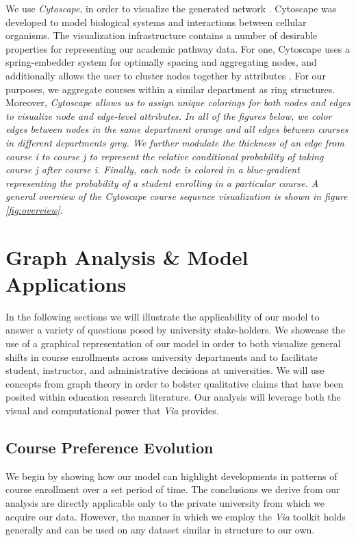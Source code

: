 \documentclass{sigchi}
\begin{document}
We use \textit{Cytoscape}, in order to visualize the  generated network \cite{shannon2003cytoscape}. Cytoscape was developed to model biological systems and interactions between cellular organisms. The visualization infrastructure contains a number of desirable properties for representing our academic pathway data. For one, Cytoscape uses a spring-embedder system for optimally spacing and aggregating nodes, and additionally allows the user to cluster nodes together by attributes \cite{Battista1994}. For our purposes, we aggregate courses within a similar department as ring structures. Moreover, \em{Cytoscape} allows us to assign unique colorings for both nodes and edges to visualize node and edge-level attributes. In all of the figures below, we color edges between nodes in the same department orange and all edges between courses in different departments grey. We further modulate the thickness of an edge from course \textit{i} to course \textit{j} to represent the relative conditional probability of taking course j after course i. Finally, each node is colored in a blue-gradient representing the probability of a student enrolling in a particular course. A general overview of the \textit{Cytoscape} course sequence visualization is shown in figure \ref{fig:overview}. 

\section{Graph Analysis \& Model Applications}
\label{sec:analysis}
In the following sections we will illustrate the applicability of our model to answer a variety of questions posed by university stake-holders. We showcase the use of a graphical representation of our model in order to both visualize general shifts in course enrollments across university departments and to facilitate student, instructor, and administrative decisions at universities. We will use concepts from graph theory in order to bolster qualitative claims that have been posited within education research literature. Our analysis will leverage both the visual and computational power that \textit{Via} provides. 

\subsection{Course Preference Evolution}
\label{sec:course_pref_evolution}

We begin by showing how our model can highlight developments in patterns of course enrollment over a set period of time. The conclusions we derive from our analysis are directly applicable only to the private university from which we acquire our data. However, the manner in which we employ the \textit{Via} toolkit holds generally and can be used on any dataset similar in structure to our own.
\end{document}
